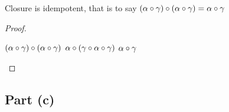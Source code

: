 \begin{lemma}\label{lemma:closure-idemp}
  Closure is idempotent, that is to say
  ${(\alpha\circ\gamma)\circ(\alpha\circ\gamma) = \alpha\circ\gamma}$
  \begin{proof}~\\
    \begin{itemize}
      \step $(\alpha\circ\gamma)\circ(\alpha\circ\gamma)$
      \step[=] $\alpha\circ(\gamma\circ\alpha\circ\gamma)$
      \step[=] $\alpha\circ\gamma$\qedhere
    \end{itemize}
  \end{proof}
\end{lemma}

\subsection{Part (c)}\label{sec:q-1-c}
